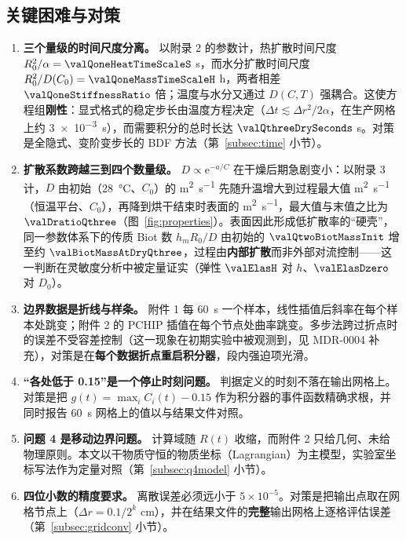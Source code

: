 \subsection{关键困难与对策}
\begin{enumerate}[leftmargin=*,itemsep=0.25em]
  \item \textbf{三个量级的时间尺度分离。} 以附录 2 的参数计，热扩散时间尺度 $R_0^2/\alpha=\valQoneHeatTimeScaleS$ s，而水分扩散时间尺度 $R_0^2/D(C_0)=\valQoneMassTimeScaleH$ h，两者相差 $\valQoneStiffnessRatio$ 倍；温度与水分又通过 $D(C,T)$ 强耦合。这使方程组\textbf{刚性}：显式格式的稳定步长由温度方程决定（$\Delta t\lesssim\Delta r^2/2\alpha$，在生产网格上约 \SI{3e-3}{\second}），而需要积分的总时长达 $\valQthreeDrySeconds$ \si{\second}。对策是全隐式、变阶变步长的 BDF 方法（第~\ref{subsec:time} 小节）。
  \item \textbf{扩散系数跨越三到四个数量级。} $D\propto\mathrm{e}^{-a/C}$ 在干燥后期急剧变小：以附录 3 计，$D$ 由初始（\SI{28}{\celsius}、$C_0$）的 \sci{\valQtwoDinit} \si{\square\meter\per\second} 先随升温增大到过程最大值 \sci{\valDmaxAppendixThree} \si{\square\meter\per\second}（恒温平台、$C_0$），再降到烘干结束时表面的 \sci{\valDsurfaceAtDryQthree} \si{\square\meter\per\second}，最大值与末值之比为 $\valDratioQthree$（图~\ref{fig:properties}）。表面因此形成低扩散率的“硬壳”，同一参数体系下的传质 Biot 数 $h_mR_0/D$ 由初始的 $\valQtwoBiotMassInit$ 增至约 $\valBiotMassAtDryQthree$，过程由\textbf{内部扩散}而非外部对流控制——这一判断在灵敏度分析中被定量证实（弹性 $\valElasH$ 对 $h$、$\valElasDzero$ 对 $D_0$）。
  \item \textbf{边界数据是折线与样条。} 附件 1 每 \SI{60}{\second} 一个样本，线性插值后斜率在每个样本处跳变；附件 2 的 PCHIP 插值在每个节点处曲率跳变。多步法跨过折点时的误差不受容差控制（这一现象在初期实验中被观测到，见 MDR-0004 补充），对策是在\textbf{每个数据折点重启积分器}，段内强迫项光滑。
  \item \textbf{“各处低于 0.15”是一个停止时刻问题。} 判据定义的时刻不落在输出网格上。对策是把 $g(t)=\max_i C_i(t)-0.15$ 作为积分器的事件函数精确求根，并同时报告 \SI{60}{\second} 网格上的值以与结果文件对照。
  \item \textbf{问题 4 是移动边界问题。} 计算域随 $R(t)$ 收缩，而附件 2 只给几何、未给物理原则。本文以干物质守恒的物质坐标（Lagrangian）为主模型，实验室坐标写法作为定量对照（第~\ref{subsec:q4model} 小节）。
  \item \textbf{四位小数的精度要求。} 离散误差必须远小于 $5\times10^{-5}$。对策是把输出点取在网格节点上（$\Delta r=0.1/2^k$ \si{\centi\meter}），并在结果文件的\textbf{完整}输出网格上逐格评估误差（第~\ref{subsec:gridconv} 小节）。
\end{enumerate}

